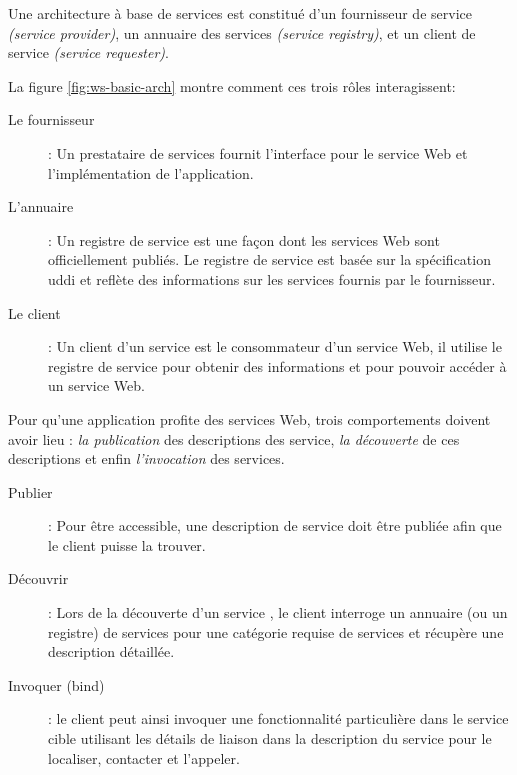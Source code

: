   Une architecture à base de services
  \cite{gottschalk2002introduction} est constitué d'un fournisseur de
  service \textit{(service provider)}, un annuaire des services
  \textit{(service registry)}, et un client de service
  \textit{(service requester)}.

  


  La figure \ref{fig:ws-basic-arch} montre comment ces trois rôles
  interagissent:

  \renewcommand{\descriptionlabel}[1]{\hspace{0.5cm}\textbullet~\textsf{#1}}
  \begin{description}
  \item[Le fournisseur]: Un prestataire de services fournit
    l'interface pour le service Web et l'implémentation de
    l'application.

  \item[L'annuaire]: Un registre de service est une façon dont les
    services Web sont officiellement publiés. Le registre de service
    est basée sur la spécification \acrshort{uddi} et reflète des
    informations sur les services fournis par le fournisseur.

  \item[Le client]: Un client d'un service est le consommateur d'un
    service Web, il utilise le registre de service pour obtenir des
    informations et pour pouvoir accéder à un service Web.
  \end{description}
  \enddescription

  Pour qu'une application profite des services Web, trois comportements
  doivent avoir lieu : \textit{la publication} des descriptions des
  service, \textit{la découverte} de ces descriptions et enfin
  \textit{l'invocation} des services.

  \renewcommand{\descriptionlabel}[1]{\hspace{0.5cm}\textbullet~\textsf{#1}}
  \begin{description}
  \item[Publier]: Pour être accessible, une description de service
    doit être publiée afin que le client puisse la trouver.

  \item[Découvrir]: Lors de la découverte d'un service , le client
    interroge un annuaire (ou un registre) de services pour une
    catégorie requise de services et récupère une description
    détaillée.

  \item[Invoquer (bind)]: le client peut ainsi invoquer une
    fonctionnalité particulière dans le service cible utilisant les
    détails de liaison dans la description du service pour le
    localiser, contacter et l'appeler.
  \end{description}
  \enddescription

